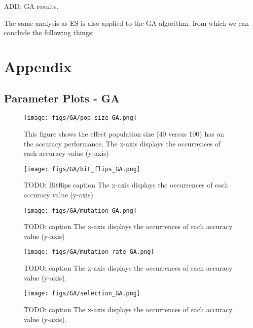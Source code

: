 \documentclass{article}
\begin{document}
ADD: GA results. 

The same analysis as ES is also applied to the GA algorithm, from which we can conclude the following things;

  
  


\newpage

\appendix
\section{Appendix}
\label{sec:app}


\subsection{Parameter Plots - GA}
\label{app:params_ga}



\begin{figure*}[htbp]
    \centering
    \texttt{[image: figs/GA/pop\_size\_GA.png]}
    \caption{
    This figure shows the effect population size (40 versus 100) has on the accuracy performance. 
    The x-axis displays the occurrences of each accuracy value (y-axis) 
    }
    \label{fig:A_GA_popsize}
\end{figure*}


\begin{figure*}[htbp]
    \centering
    \texttt{[image: figs/GA/bit\_flips\_GA.png]}
    \caption{
    TODO: Bitflips caption
    The x-axis displays the occurrences of each accuracy value (y-axis)
    }
    \label{fig:A_GA_bitflip}
\end{figure*}


\begin{figure*}[htbp]
    \centering
    \texttt{[image: figs/GA/mutation\_GA.png]}
    \caption{
    TODO: caption 
    The x-axis displays the occurrences of each accuracy value (y-axis)
    }
    \label{fig:A_GA_mutation}
\end{figure*}


\begin{figure}[htbp]
    \hspace*{-1.5 cm} 
    \centering
    \texttt{[image: figs/GA/mutation\_rate\_GA.png]}
    \caption{
    TODO: caption
    The x-axis displays the occurrences of each accuracy value (y-axis). }
    \label{fig:GA_mutation_rate}
\end{figure}


\begin{figure}[H]
    \centering
    \texttt{[image: figs/GA/selection\_GA.png]}
    \caption{
    TODO: caption
    The x-axis displays the occurrences of each accuracy value (y-axis). }
    \label{fig:GA_selection}
\end{figure}
\end{document}

